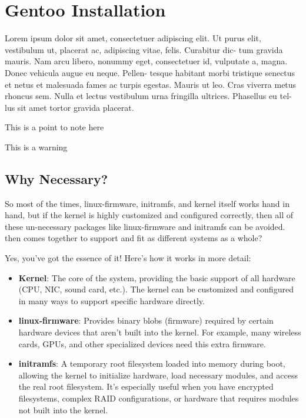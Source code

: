 \chapter{Gentoo Installation}

\begin{chapterdesc}
Lorem ipsum dolor sit amet, consectetuer adipiscing elit. Ut purus elit, vestibulum ut, placerat ac, adipiscing vitae, felis. Curabitur dic- tum gravida mauris. Nam arcu libero, nonummy eget, consectetuer id, vulputate a, magna. Donec vehicula augue eu neque. Pellen- tesque habitant morbi tristique senectus et netus et malesuada fames ac turpis egestas. Mauris ut leo. Cras viverra metus rhoncus sem. Nulla et lectus vestibulum urna fringilla ultrices. Phasellus eu tel- lus sit amet tortor gravida placerat.
\end{chapterdesc}

\begin{note}
  This is a point to note here
\end{note}

\begin{warning}
  This is a warning
\end{warning}

\section{Why Necessary?}
So most of the times, linux-firmware, initramfs, and kernel itself works hand in hand, but if the kernel is highly customized and configured correctly, then all of these un-necessary packages like linux-firmware and initramfs can be avoided. then comes together to support and fit as different systems as a whole?

Yes, you’ve got the essence of it! Here's how it works in more detail:

\begin{itemize}
    \item \textbf{Kernel}: The core of the system, providing the basic support of all hardware (CPU, NIC, sound card, etc.). The kernel can be customized and configured in many ways to support specific hardware directly.
    \item \textbf{linux-firmware}: Provides binary blobs (firmware) required by certain hardware devices that aren't built into the kernel. For example, many wireless cards, GPUs, and other specialized devices need this extra firmware.
    \item \textbf{initramfs}: A temporary root filesystem loaded into memory during boot, allowing the kernel to initialize hardware, load necessary modules, and access the real root filesystem. It’s especially useful when you have encrypted filesystems, complex RAID configurations, or hardware that requires modules not built into the kernel.
\end{itemize}

